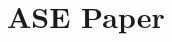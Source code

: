 \chapter[ASE Paper]
{ASE Paper}%
\label{ch:ase2020}
\graphicspath{{mainmatter/publications/figures/icsme2020/}}